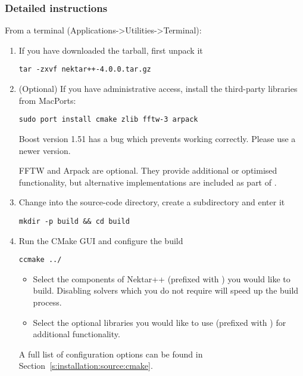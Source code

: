 \subsubsection{Detailed instructions}
From a terminal (Applications->Utilities->Terminal):
\begin{enumerate}
    \item If you have downloaded the tarball, first unpack it
    \begin{lstlisting}[style=BashInputStyle]
    tar -zxvf nektar++-4.0.0.tar.gz
    \end{lstlisting}
    
    \item (Optional) If you have administrative access, install the third-party
    libraries from MacPorts:
    \begin{lstlisting}[style=BashInputStyle]
    sudo port install cmake zlib fftw-3 arpack
    \end{lstlisting}
    
    \begin{warningbox}
    Boost version 1.51 has a bug which prevents \nekpp working correctly.
    Please use a newer version.
    \end{warningbox}
    
    \begin{notebox}
    FFTW and Arpack are optional. They provide additional or optimised
    functionality, but alternative implementations are included as part of
    \nekpp.
    \end{notebox}

    \item Change into the source-code directory, create a 
    subdirectory and enter it 
    \begin{lstlisting}[style=BashInputStyle]
    mkdir -p build && cd build
    \end{lstlisting}
    
    \item Run the CMake GUI and configure the build
    \begin{lstlisting}[style=BashInputStyle]
    ccmake ../
    \end{lstlisting}
    \begin{itemize}
        \item Select the components of Nektar++ (prefixed with
        ) you would like to build. Disabling solvers
        which you do not require will speed up the build process.
        \item Select the optional libraries you would like to use (prefixed with
        ) for additional functionality.
    \end{itemize}
    A full list of configuration options can be found in
    Section~\ref{s:installation:source:cmake}.
    

\end{enumerate}
